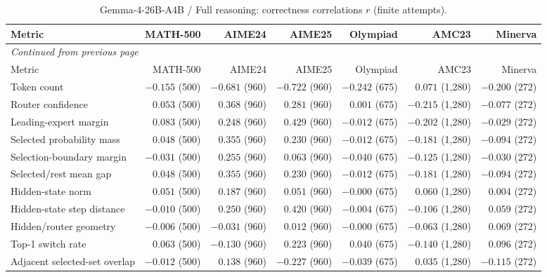 \begingroup\scriptsize\setlength{\tabcolsep}{4pt}
\begin{longtable}{@{}lrrrrrr@{}}
\caption{Gemma-4-26B-A4B / Full reasoning: correctness correlations $r$ (finite attempts).}\label{tab:multi-gemma-reasoning}\\
\toprule
Metric & MATH-500 & AIME24 & AIME25 & Olympiad & AMC23 & Minerva \\
\midrule\endfirsthead
\multicolumn{7}{l}{\textit{Continued from previous page}}\\
\toprule
Metric & MATH-500 & AIME24 & AIME25 & Olympiad & AMC23 & Minerva \\
\midrule\endhead
\bottomrule\endfoot
Token count & $-0.155$ (500) & $-0.681$ (960) & $-0.722$ (960) & $-0.242$ (675) & $0.071$ (1,280) & $-0.200$ (272) \\
Router confidence & $0.053$ (500) & $0.368$ (960) & $0.281$ (960) & $0.001$ (675) & $-0.215$ (1,280) & $-0.077$ (272) \\
Leading-expert margin & $0.083$ (500) & $0.248$ (960) & $0.429$ (960) & $-0.012$ (675) & $-0.202$ (1,280) & $-0.029$ (272) \\
Selected probability mass & $0.048$ (500) & $0.355$ (960) & $0.230$ (960) & $-0.012$ (675) & $-0.181$ (1,280) & $-0.094$ (272) \\
Selection-boundary margin & $-0.031$ (500) & $0.255$ (960) & $0.063$ (960) & $-0.040$ (675) & $-0.125$ (1,280) & $-0.030$ (272) \\
Selected/rest mean gap & $0.048$ (500) & $0.355$ (960) & $0.230$ (960) & $-0.012$ (675) & $-0.181$ (1,280) & $-0.094$ (272) \\
Hidden-state norm & $0.051$ (500) & $0.187$ (960) & $0.051$ (960) & $-0.000$ (675) & $0.060$ (1,280) & $0.004$ (272) \\
Hidden-state step distance & $-0.010$ (500) & $0.250$ (960) & $0.420$ (960) & $-0.004$ (675) & $-0.106$ (1,280) & $0.059$ (272) \\
Hidden/router geometry & $-0.006$ (500) & $-0.031$ (960) & $0.012$ (960) & $-0.000$ (675) & $-0.063$ (1,280) & $0.069$ (272) \\
Top-1 switch rate & $0.063$ (500) & $-0.130$ (960) & $0.223$ (960) & $0.040$ (675) & $-0.140$ (1,280) & $0.096$ (272) \\
Adjacent selected-set overlap & $-0.012$ (500) & $0.138$ (960) & $-0.227$ (960) & $-0.039$ (675) & $0.035$ (1,280) & $-0.115$ (272) \\
\end{longtable}\endgroup

